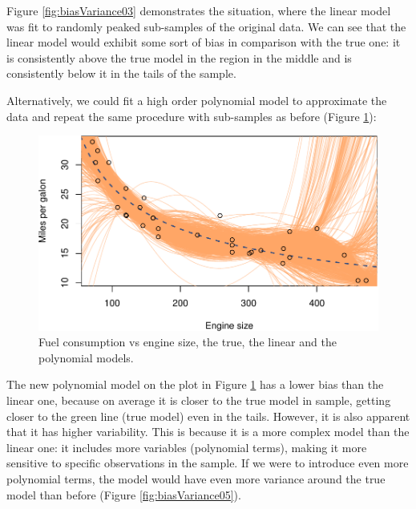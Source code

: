 \documentclass[
]{book}
\theoremstyle{definition}
\theoremstyle{definition}
\theoremstyle{definition}
\theoremstyle{definition}
\theoremstyle{remark}
\begin{document}
Figure \ref{fig:biasVariance03} demonstrates the situation, where the linear model was fit to randomly peaked sub-samples of the original data. We can see that the linear model would exhibit some sort of bias in comparison with the true one: it is consistently above the true model in the region in the middle and is consistently below it in the tails of the sample.

Alternatively, we could fit a high order polynomial model to approximate the data and repeat the same procedure with sub-samples as before (Figure \ref{fig:biasVariance04}):

\begin{figure}
\centering
\includegraphics{Svetunkov---Statistics-for-Business-Analytics_files/figure-latex/biasVariance04-1.pdf}
\caption{\label{fig:biasVariance04}Fuel consumption vs engine size, the true, the linear and the polynomial models.}
\end{figure}

The new polynomial model on the plot in Figure \ref{fig:biasVariance04} has a lower bias than the linear one, because on average it is closer to the true model in sample, getting closer to the green line (true model) even in the tails. However, it is also apparent that it has higher variability. This is because it is a more complex model than the linear one: it includes more variables (polynomial terms), making it more sensitive to specific observations in the sample. If we were to introduce even more polynomial terms, the model would have even more variance around the true model than before (Figure \ref{fig:biasVariance05}).
\end{document}
